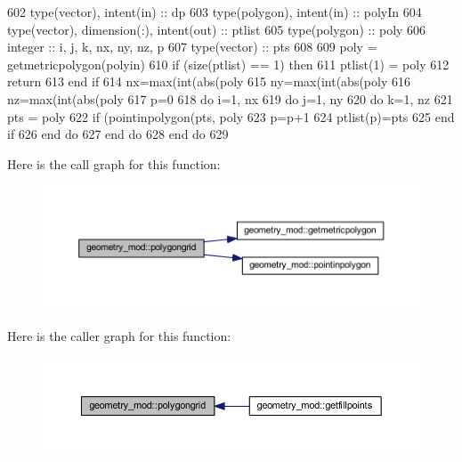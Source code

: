 \begin{DoxyCode}
602     \textcolor{keywordtype}{type}(vector), \textcolor{keywordtype}{intent(in)} :: dp
603     \textcolor{keywordtype}{type}(polygon), \textcolor{keywordtype}{intent(in)} :: polyIn
604     \textcolor{keywordtype}{type}(vector), \textcolor{keywordtype}{dimension(:)}, \textcolor{keywordtype}{intent(out)} :: ptlist
605     \textcolor{keywordtype}{type}(polygon) :: poly
606     \textcolor{keywordtype}{integer} :: i, j, k, nx, ny, nz, p
607     \textcolor{keywordtype}{type}(vector) :: pts
608 
609     poly = getmetricpolygon(polyin)
610     \textcolor{keywordflow}{if} (\textcolor{keyword}{size}(ptlist) == 1) \textcolor{keywordflow}{then}
611         ptlist(1) = poly%
612         \textcolor{keywordflow}{return}
613 \textcolor{keywordflow}{    end if}
614     nx=max(int(abs(poly%
615     ny=max(int(abs(poly%
616     nz=max(int(abs(poly%
617     p=0
618     \textcolor{keywordflow}{do} i=1, nx
619         \textcolor{keywordflow}{do} j=1, ny
620             \textcolor{keywordflow}{do} k=1, nz
621                 pts = poly%
622                 \textcolor{keywordflow}{if} (pointinpolygon(pts, poly%
623                     p=p+1
624                     ptlist(p)=pts
625 \textcolor{keywordflow}{                end if}
626 \textcolor{keywordflow}{            end do}
627 \textcolor{keywordflow}{        end do}
628 \textcolor{keywordflow}{    end do}
629 
\end{DoxyCode}
Here is the call graph for this function\+:\nopagebreak
\begin{figure}[H]
\begin{center}
\leavevmode
\includegraphics[width=350pt]{namespacegeometry__mod_a4862bb9e5bbc62fd581a34c4249b84d1_cgraph}
\end{center}
\end{figure}
Here is the caller graph for this function\+:\nopagebreak
\begin{figure}[H]
\begin{center}
\leavevmode
\includegraphics[width=350pt]{namespacegeometry__mod_a4862bb9e5bbc62fd581a34c4249b84d1_icgraph}
\end{center}
\end{figure}
